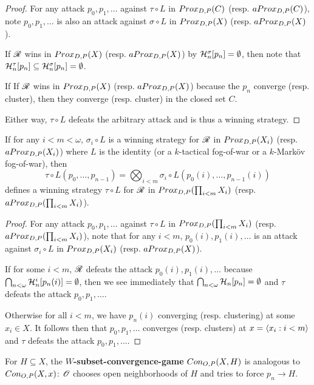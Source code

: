 \begin{proof}
For any attack $p_0,p_1,\dots$ against $\tau\circ L$ in $Prox_{D,P}(C)$ (resp. $aProx_{D,P}(C)$), note $p_0,p_1,\dots$ is also an attack against $\sigma\circ L$ in $Prox_{D,P}(X)$ (resp. $aProx_{D,P}(X)$). 

If $\mathscr{R}$ wins in $Prox_{D,P}(X)$ (resp. $aProx_{D,P}(X)$) by $\mathcal{H}^\sigma_n[p_n]=\emptyset$, then note that $\mathcal{H}^\tau_n[p_n]\subseteq\mathcal{H}^\sigma_n[p_n]=\emptyset$. 

If If $\mathscr{R}$ wins in $Prox_{D,P}(X)$ (resp. $aProx_{D,P}(X)$) because the $p_n$ converge (resp. cluster), then they converge (resp. cluster) in the closed set $C$. 

Either way, $\tau\circ L$ defeats the arbitrary attack and is thus a winning strategy.
\end{proof}

\begin{proposition}
If for any $i<m<\omega$, $\sigma_i\circ L$ is a winning strategy for $\mathscr{R}$ in $Prox_{D,P}(X_i)$ (resp. $aProx_{D,P}(X_i)$) where $L$ is the identity (or a $k$-tactical fog-of-war or a $k$-Mark\"ov fog-of-war), then
  \[
    \tau\circ L(p_0,\dots,p_{n-1}) = \bigotimes_{i<m}\sigma_i\circ L(p_0(i),\dots,p_{n-1}(i))
  \]
defines a winning strategy $\tau\circ L$ for $\mathscr{R}$ in $Prox_{D,P}(\prod_{i<m}X_i)$ (resp. $aProx_{D,P}(\prod_{i<m}X_i)$).
\end{proposition}

\begin{proof}
For any attack $p_0,p_1,\dots$ against $\tau\circ L$ in $Prox_{D,P}(\prod_{i<m}X_i)$ (resp. $aProx_{D,P}(\prod_{i<m}X_i)$), note that for any $i<m$, $p_0(i),p_1(i),\dots$ is an attack against $\sigma_i\circ L$ in $Prox_{D,P}(X_i)$ (resp. $aProx_{D,P}(X)$).

If for some $i<m$, $\mathscr{R}$ defeats the attack $p_0(i),p_1(i),\dots$ because $\bigcap_{n<\omega}\mathcal{H}^i_n[p_n(i)]=\emptyset$, then we see immediately that $\bigcap_{n<\omega} \mathcal{H}_n[p_n]=\emptyset$ and $\tau$ defeats the attack $p_0,p_1,\dots$.

Otherwise for all $i<m$, we have $p_n(i)$ converging (resp. clustering) at some $x_i\in X$. It follows then that $p_0,p_1,\dots$ converges (resp. clusters) at $x=\langle x_i:i<m\rangle$ and $\tau$ defeats the attack $p_0,p_1,\dots$.
\end{proof}

\begin{definition}
For $H\subseteq X$, the \textbf{$W$-subset-convergence-game} $Con_{O,P}(X,H)$ is analogous to $Con_{O,P}(X,x)$: $\mathscr{O}$ chooses open neighborhoods of $H$ and tries to force $p_n\to H$.
\end{definition}

